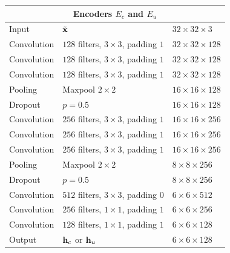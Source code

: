 \begin{table}[p]
  \centering
  \begin{tabular}{ l l l}
  \toprule
  \multicolumn{3}{c}{\textbf{Encoders $E_c$ and $E_u$}} \\
  \midrule
  Input & $\tilde{\mathbf{x}}$ & $32\times 32\times 3$ \\
  Convolution & $128$ filters, $3\times3$, padding $1$ & $32\times 32\times 128$ \\
  Convolution & $128$ filters, $3\times3$, padding $1$ & $32\times 32\times 128$ \\
  Convolution & $128$ filters, $3\times3$, padding $1$ & $32\times 32\times 128$ \\
  Pooling   & Maxpool $2\times2$ & $16\times 16\times 128$ \\
  Dropout   & $p=0.5$  & $16\times 16\times 128$ \\
  Convolution & $256$ filters, $3\times3$, padding $1$  & $16\times 16\times 256$ \\
  Convolution & $256$ filters, $3\times3$, padding $1$  & $16\times 16\times 256$ \\
  Convolution & $256$ filters, $3\times3$, padding $1$  & $16\times 16\times 256$ \\
  Pooling & Maxpool $2\times2$  & $8\times 8\times 256$ \\
  Dropout & $p=0.5$  & $8\times 8\times 256$ \\
  Convolution & $512$ filters, $3\times3$, padding $0$  & $6\times 6\times 512$ \\
  Convolution & $256$ filters, $1\times1$, padding $1$ & $6\times 6\times 256$ \\
  Convolution & $128$ filters, $1\times1$, padding $1$ & $6\times 6\times 128$ \\
  Output & $\mathbf{h}_c$ or $\mathbf{h}_u$ & $6\times 6\times 128$ \\
  

\end{tabular}
\end{table}
